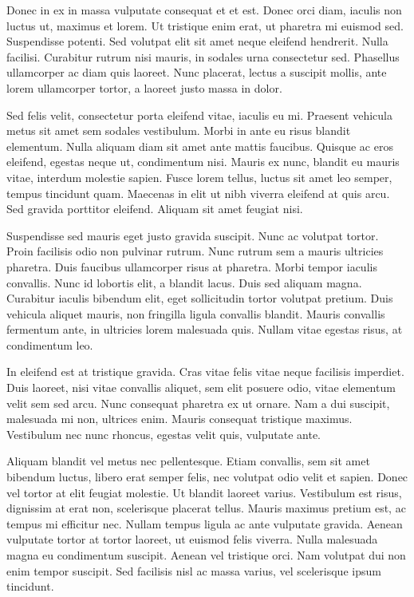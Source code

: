 \documentclass[twocolumn]{IEEEtran}
\begin{document}
Donec in ex in massa vulputate consequat et et est. Donec orci diam, iaculis non luctus ut, maximus et lorem. Ut tristique enim erat, ut pharetra mi euismod sed. Suspendisse potenti. Sed volutpat elit sit amet neque eleifend hendrerit. Nulla facilisi. Curabitur rutrum nisi mauris, in sodales urna consectetur sed. Phasellus ullamcorper ac diam quis laoreet. Nunc placerat, lectus a suscipit mollis, ante lorem ullamcorper tortor, a laoreet justo massa in dolor.

Sed felis velit, consectetur porta eleifend vitae, iaculis eu mi. Praesent vehicula metus sit amet sem sodales vestibulum. Morbi in ante eu risus blandit elementum. Nulla aliquam diam sit amet ante mattis faucibus. Quisque ac eros eleifend, egestas neque ut, condimentum nisi. Mauris ex nunc, blandit eu mauris vitae, interdum molestie sapien. Fusce lorem tellus, luctus sit amet leo semper, tempus tincidunt quam. Maecenas in elit ut nibh viverra eleifend at quis arcu. Sed gravida porttitor eleifend. Aliquam sit amet feugiat nisi.

Suspendisse sed mauris eget justo gravida suscipit. Nunc ac volutpat tortor. Proin facilisis odio non pulvinar rutrum. Nunc rutrum sem a mauris ultricies pharetra. Duis faucibus ullamcorper risus at pharetra. Morbi tempor iaculis convallis. Nunc id lobortis elit, a blandit lacus. Duis sed aliquam magna. Curabitur iaculis bibendum elit, eget sollicitudin tortor volutpat pretium. Duis vehicula aliquet mauris, non fringilla ligula convallis blandit. Mauris convallis fermentum ante, in ultricies lorem malesuada quis. Nullam vitae egestas risus, at condimentum leo.

In eleifend est at tristique gravida. Cras vitae felis vitae neque facilisis imperdiet. Duis laoreet, nisi vitae convallis aliquet, sem elit posuere odio, vitae elementum velit sem sed arcu. Nunc consequat pharetra ex ut ornare. Nam a dui suscipit, malesuada mi non, ultrices enim. Mauris consequat tristique maximus. Vestibulum nec nunc rhoncus, egestas velit quis, vulputate ante.

Aliquam blandit vel metus nec pellentesque. Etiam convallis, sem sit amet bibendum luctus, libero erat semper felis, nec volutpat odio velit et sapien. Donec vel tortor at elit feugiat molestie. Ut blandit laoreet varius. Vestibulum est risus, dignissim at erat non, scelerisque placerat tellus. Mauris maximus pretium est, ac tempus mi efficitur nec. Nullam tempus ligula ac ante vulputate gravida. Aenean vulputate tortor at tortor laoreet, ut euismod felis viverra. Nulla malesuada magna eu condimentum suscipit. Aenean vel tristique orci. Nam volutpat dui non enim tempor suscipit. Sed facilisis nisl ac massa varius, vel scelerisque ipsum tincidunt.
\end{document}
